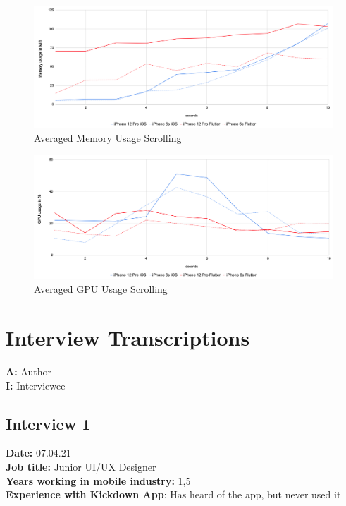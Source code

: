 \begin{figure}[!h]
    \centering
    \includegraphics[width=\linewidth]{images/performance_results/image_gallery/avg_memory_usage_image_gallery.png}
    \caption{Averaged Memory Usage Scrolling}
    \label{fig:avg_memory_usage_scrolling}
\end{figure}

\begin{figure}[!h]
    \centering
    \includegraphics[width=\linewidth]{images/performance_results/image_gallery/avg_gpu_usage_image_gallery.png}
    \caption{Averaged GPU Usage Scrolling}
    \label{fig:avg_gpu_usage_scrolling}
\end{figure}

\section{Interview Transcriptions}

\textbf{A:} Author\\
\textbf{I:} Interviewee

\subsection{Interview 1}
\textbf{Date:} 07.04.21\\
\textbf{Job title:} Junior UI/UX Designer\\
\textbf{Years working in mobile industry:} 1,5\\
\textbf{Experience with Kickdown App}: Has heard of the app, but never used it\\

